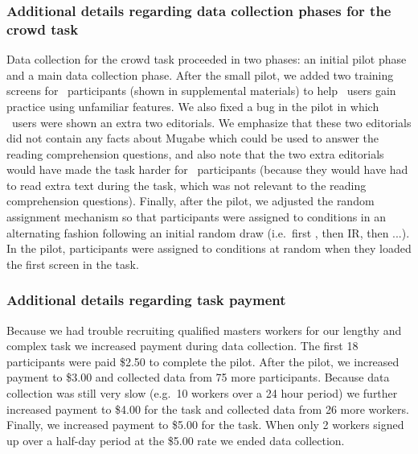 \subsubsection*{Additional details regarding data collection phases for the crowd task}
Data collection for the crowd task proceeded in two phases: an initial pilot phase and a main data collection phase.
After the small pilot, we added two training screens for \ours~participants (shown in supplemental materials) to help \ours~users gain practice using unfamiliar features. 
We also fixed a bug in the pilot in which \ours~users were shown an extra two editorials. 
We emphasize that these two editorials did not contain any facts about Mugabe which could be used to answer the reading comprehension questions, and also note that the 
two extra editorials would have made the task harder for \ours~participants (because they would have had to read extra text during the task, which was not relevant to the reading comprehension questions).
Finally, after the pilot, we adjusted the random assignment mechanism so that participants were assigned to conditions in an alternating fashion following an initial random draw (i.e.\ first \ours, then IR, then \ours...). In the pilot, participants were assigned to conditions at random when they loaded the first screen in the task.

\subsubsection*{Additional details regarding task payment}
Because we had trouble recruiting qualified masters workers for our lengthy and complex task we increased payment during data collection. The first 18 participants were paid \$2.50 to complete the pilot. After the pilot, we increased payment to \$3.00 and collected data from 75 more participants. Because data collection was still very slow (e.g.\ 10 workers over a 24 hour period) we further increased payment to \$4.00 for the task and collected data from 26 more workers. Finally, we increased payment to \$5.00 for the task. When only 2 workers signed up over a half-day period at the \$5.00 rate we ended data collection.

